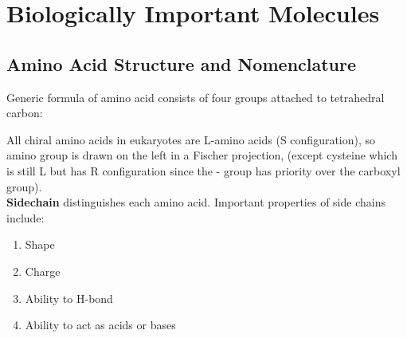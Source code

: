 \documentclass[10pt,a4paper]{report}
\begin{document}
	\chapter{Biologically Important Molecules}
	\section{Amino Acid Structure and Nomenclature}
	
	Generic formula of amino acid consists of four groups attached to tetrahedral carbon:
	\begin{center}
		\setatomsep{2.3em}
		\setcrambond{4pt}{}{}
	\end{center}
	All chiral amino acids in eukaryotes are L-amino acids (S configuration), so amino group is drawn on the left in a Fischer projection, (except cysteine which is still L but has R configuration since the - group has priority over the carboxyl group).\\
	\textbf{Sidechain} distinguishes each amino acid. Important properties of side chains include:
	\begin{enumerate}
		\item Shape
		\item Charge
		\item Ability to H-bond
		\item Ability to act as acids or bases
	\end{enumerate}
	
\end{document}
